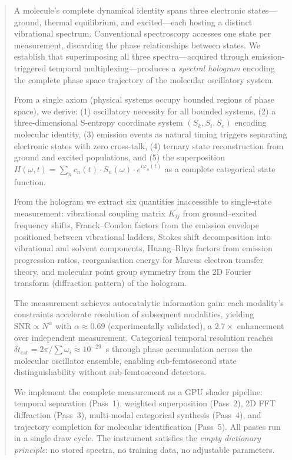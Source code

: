 \documentclass[11pt,a4paper]{article}
\theoremstyle{definition}
\theoremstyle{remark}
\newcommand{\Sk}{S_k}
\newcommand{\St}{S_t}
\newcommand{\Se}{S_e}
\begin{document}
\begin{abstract}
\noindent A molecule's complete dynamical identity spans three electronic states---ground, thermal equilibrium, and excited---each hosting a distinct vibrational spectrum. Conventional spectroscopy accesses one state per measurement, discarding the phase relationships between states. We establish that superimposing all three spectra---acquired through emission-triggered temporal multiplexing---produces a \emph{spectral hologram} encoding the complete phase space trajectory of the molecular oscillatory system.

From a single axiom (physical systems occupy bounded regions of phase space), we derive: (1) oscillatory necessity for all bounded systems, (2) a three-dimensional S-entropy coordinate system $(\Sk, \St, \Se)$ encoding molecular identity, (3) emission events as natural timing triggers separating electronic states with zero cross-talk, (4) ternary state reconstruction from ground and excited populations, and (5) the superposition $H(\omega,t) = \sum_n c_n(t) \cdot S_n(\omega) \cdot e^{i\varphi_n(t)}$ as a complete categorical state function.

From the hologram we extract six quantities inaccessible to single-state measurement: vibrational coupling matrix $K_{ij}$ from ground--excited frequency shifts, Franck--Condon factors from the emission envelope positioned between vibrational ladders, Stokes shift decomposition into vibrational and solvent components, Huang--Rhys factors from emission progression ratios, reorganisation energy for Marcus electron transfer theory, and molecular point group symmetry from the 2D Fourier transform (diffraction pattern) of the hologram.

The measurement achieves autocatalytic information gain: each modality's constraints accelerate resolution of subsequent modalities, yielding $\mathrm{SNR} \propto N^{\alpha}$ with $\alpha \approx 0.69$ (experimentally validated), a $2.7\times$ enhancement over independent measurement. Categorical temporal resolution reaches $\delta t_{\mathrm{cat}} = 2\pi / \sum \omega_i \approx 10^{-29}$~s through phase accumulation across the molecular oscillator ensemble, enabling sub-femtosecond state distinguishability without sub-femtosecond detectors.

We implement the complete measurement as a GPU shader pipeline: temporal separation (Pass~1), weighted superposition (Pass~2), 2D FFT diffraction (Pass~3), multi-modal categorical synthesis (Pass~4), and trajectory completion for molecular identification (Pass~5). All passes run in a single draw cycle. The instrument satisfies the \emph{empty dictionary principle}: no stored spectra, no training data, no adjustable parameters.


\end{abstract}
\end{document}
